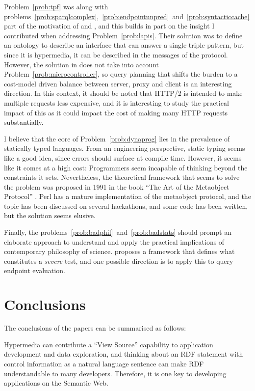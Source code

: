 Problem~\ref{prob:tpf} was along with
problems~\ref{prob:sparqlcomplex},~\ref{prob:endpointunpred}~and~\ref{prob:syntacticcache}
part of the motivation of \cite{ldf1} and \cite{verborgh2014querying},
and this builds in part on the insight I contributed when addressing
Problem~\ref{prob:lapis}. Their solution was to define an ontology to
describe an interface that can answer a single triple pattern, but
since it is hypermedia, it can be described in the messages of the
protocol. However, the solution in \cite{verborgh2014querying} does
not take into account Problem~\ref{prob:microcontroller}, so query
planning that shifts the burden to a cost-model driven balance between
server, proxy and client is an interesting direction. In this context,
it should be noted that HTTP/2 \cite{rfc7540} is intended to make
multiple requests less expensive, and it is interesting to study the
practical impact of this as it could impact the cost of making many
HTTP requests substantially.

I believe that the core of Problem~\ref{prob:dynaprog} lies in the
prevalence of statically typed languages. From an engineering
perspective, static typing seems like a good idea, since errors should
surface at compile time. However, it seems like it comes at a high
cost: Programmers seem incapable of thinking beyond the constraints it
sets. Nevertheless, the theoretical framework that seems to solve the
problem was proposed in 1991 in the book ``The Art of the Metaobject
Protocol'' \cite{kiczales1991art}. Perl has a mature implementation of
the metaobject protocol, and the topic has been discussed on several
hackathons, and some code has been written, but the solution seems
elusive.

Finally, the problems~\ref{prob:badphil}~and~\ref{prob:badstats}
should prompt an elaborate approach to understand and apply the
practical implications of contemporary philosophy of
science. \cite{Mayo2005-MAYEAP} proposes a framework that defines what
constitutes a \emph{severe} test, and one possible direction is to
apply this to query endpoint evaluation.

\section{Conclusions}\label{sec:conclusions}

The conclusions of the papers can be summarised as follows:

Hypermedia can contribute a ``View Source'' capability to application
development and data exploration, and thinking about an RDF statement
with control information as a natural language sentence can make RDF
understandable to many developers. Therefore, it is one key to
developing applications on the Semantic Web.


